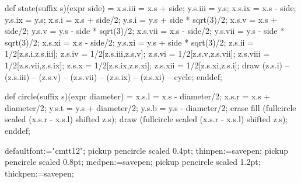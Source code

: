 \def\M#1{\hbox{\tt#1}}
\def\T#1{\\\null\kern\oldparindent\M{#1}}

\def\Table#1{\vtop{%
\halign{\strut\vrule\enspace\M{##}\hfil\enspace
 &\enspace\hfil\M{##}\hfil\enspace
 &\vrule\enspace\hfil\M{##}\hfil\enspace
 &\enspace\hfil\M{##}\hfil\enspace
 &\enspace\hfil\M{##}\hfil\enspace\vrule\cr
 \noalign{\vskip-11pt\hrule}
 {\sc c}&{\sc r}&{\sc n}&{\sc w}&{\sc m}\cr
 \noalign{\hrule}\noalign{\kern\jot}\noalign{\hrule}
 #1\crcr
 \noalign{\hrule}
}}}

\def\tape#1#2{\line{\qquad\tt #1\hfil\tentt #2}}

\def\TM#1<#2>{\def\1{#1}\ifx\empty\1\else{\cal #1}\fi
 \langle{\frak #2}\rangle}
\def\RS#1<#2>{\def\1{#1}\ifx\empty\1\else{\cal #1}\fi
 \langle\hbox{\tt #2}\rangle}

\def\label#1{\leavevmode\dest\lbl{#1}{label}\ignorespaces}


\def\MTbeginfig{\begingroup \catcode`\"=12 \MTbeginchar}
\def\MTendfig;{\MTendchar; \endgroup}

\MTcode
def state(suffix s)(expr side) =
 x.s.iii = x.s + side;   y.s.iii = y.s;
 x.s.ix = x.s - side;    y.s.ix = y.s;
 x.s.i = x.s + side/2;   y.s.i = y.s + side * sqrt(3)/2;
 x.s.v = x.s + side/2;   y.s.v = y.s - side * sqrt(3)/2;
 x.s.vii = x.s - side/2; y.s.vii = y.s - side * sqrt(3)/2;
 x.s.xi = x.s - side/2;  y.s.xi = y.s + side * sqrt(3)/2;
 z.s.ii = 1/2[z.s.i,z.s.iii];
 z.s.iv = 1/2[z.s.iii,z.s.v];
 z.s.vi = 1/2[z.s.v,z.s.vii];
 z.s.viii = 1/2[z.s.vii,z.s.ix];
 z.s.x = 1/2[z.s.ix,z.s.xi];
 z.s.xii = 1/2[z.s.xi,z.s.i];
 draw (z.s.i) -- (z.s.iii) -- (z.s.v) -- (z.s.vii) -- (z.s.ix) -- (z.s.xi) -- cycle;
enddef;

\MTcode
def circle(suffix s)(expr diameter) =
 x.s.l = x.s - diameter/2;  x.s.r = x.s + diameter/2;
 y.s.t = y.s + diameter/2;  y.s.b = y.s - diameter/2;
 erase fill (fullcircle scaled (x.s.r - x.s.l) shifted z.s);
 draw (fullcircle scaled (x.s.r - x.s.l) shifted z.s);
enddef;

\MTcode
defaultfont:="cmtt12";
pickup pencircle scaled 0.4pt; thinpen:=savepen;
pickup pencircle scaled 0.8pt; medpen:=savepen;
pickup pencircle scaled 1.2pt; thickpen:=savepen;

\def\MTresetpa;{\MTline{ path pa[],
 pa[]O,pa[]I,pa[]A,pa[]B,pa[]X,pa[]Y,pa[]M,pa[]N,pa[]L,pa[]R,pa[]S,pa[]T,pa[]Z;}}

\def\MTstate(#1)"#2""#3";{%
  \MTline{ state(#1,6mm);}
  \MTline{ z#1.lbl1 = z#1+(0,3pt);}
  \MTline{ label("#2", z#1.lbl1);}
  \MTline{ z#1.lbl2 = z#1.vi+(0,8pt);}
  \MTline{ label("#3", z#1.lbl2);}
}


